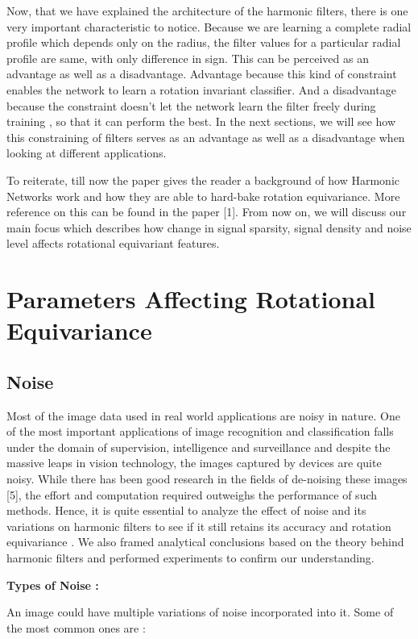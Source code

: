 \documentclass{article}
\begin{document}
Now, that we have explained the architecture of the harmonic filters, there is one very important characteristic to notice. Because we are learning a complete radial profile which depends only on the radius, the filter values for a particular radial profile are same, with only difference in sign. This can be perceived as an advantage as well as a disadvantage. Advantage because this kind of constraint enables the network to learn a rotation invariant classifier. And a disadvantage because the constraint doesn't let the network learn the filter freely during training , so that it can perform the best. In the next sections, we will see how this constraining of filters serves as an advantage as well as a disadvantage when looking at different applications.

To reiterate, till now the paper gives the reader a background of how Harmonic Networks work and how they are able to hard-bake rotation equivariance. More reference on this can be found in the paper [1]. From now on, we will discuss our main focus which describes how change in signal sparsity, signal density and noise level affects rotational equivariant features. 

\section{Parameters Affecting Rotational Equivariance}

\subsection{Noise}
Most of the image data used in real world applications are noisy in nature. One of the most important applications of image recognition and classification falls under the domain of supervision, intelligence and surveillance and despite the massive leaps in vision technology, the images captured by devices are quite noisy. While there has been good research in the fields of de-noising these images [5], the effort and computation required outweighs the performance of such methods. 
Hence, it is quite essential to analyze the effect of noise and its variations on harmonic filters to see if it still retains its accuracy and rotation equivariance . We also framed analytical conclusions based on the theory behind harmonic filters and performed experiments to confirm our understanding.

\textbf{Types of Noise :}

An image could have multiple variations of noise incorporated into it. Some of the most common ones are :
\end{document}
